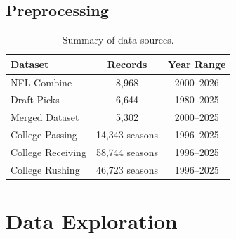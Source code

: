 \documentclass[11pt]{article}
\begin{document}
\subsection{Preprocessing}


\begin{table}[H]
  \centering
  \begin{tabular}{lcc}
    \toprule
    Dataset & Records & Year Range \\
    \midrule
    NFL Combine & 8,968 & 2000--2026 \\
    Draft Picks & 6,644 & 1980--2025 \\
    Merged Dataset & 5,302 & 2000--2025 \\
    College Passing & 14,343 seasons & 1996--2025 \\
    College Receiving & 58,744 seasons & 1996--2025 \\
    College Rushing & 46,723 seasons & 1996--2025 \\
    \bottomrule
  \end{tabular}
  \caption{Summary of data sources.}
  \label{tab:data_summary}
\end{table}


\section{Data Exploration}
\end{document}
